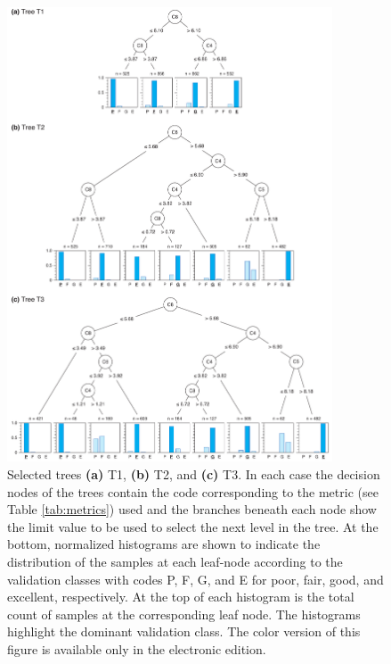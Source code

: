 \begin{figure}
	\centering
	\includegraphics[width=0.86\textwidth]{figures/pdf/figure-09}
	\caption{Selected trees \textbf{(a)} T1, \textbf{(b)} T2, and \textbf{(c)} T3. In each case the decision nodes of the trees contain the code corresponding to the metric (see Table \ref{tab:metrics}) used and the branches beneath each node show the limit value to be used to select the next level in the tree. At the bottom, normalized histograms are shown to indicate the distribution of the samples at each leaf-node according to the validation classes with codes P, F, G, and E for poor, fair, good, and excellent, respectively. At the top of each histogram is the total count of samples at the corresponding leaf node. The histograms highlight the dominant validation class. The color version of this figure is available only in the electronic edition.}
	\label{fig:trees}
\end{figure}

